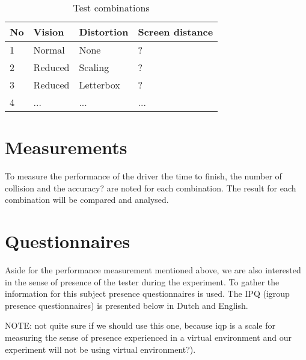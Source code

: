 \begin{table}[h]
\begin{tabular}{|l|lll|}
\hline
No & Vision  & Distortion & Screen distance \\\hline
1  & Normal  & None              & ?               \\
2  & Reduced & Scaling           & ?               \\
3  & Reduced & Letterbox           & ?               \\
4  & ...     & ...               & ...             \\\hline
\end{tabular}
\caption{Test combinations}
\label{measurementcombinations}
\end{table}


\section{Measurements}
To measure the performance of the driver the time to finish, the number of collision and the accuracy? are noted for each combination. The result for each combination will be compared and analysed.
\iffalse
- time
- accuracy
- collision
- driver comfort level (This can be achieved by using questionnaires)
- Screen distance
- Screen resolution
- Screen Size
Reduced vs no-reduced.
\fi

\section{Questionnaires}
Aside for the performance measurement mentioned above, we are also interested in the sense of presence of the tester during the experiment. To gather the information for this subject presence questionnaires is used. The IPQ (igroup presence questionnaires) is presented below in Dutch and English. 

NOTE: not quite sure if we should use this one, because iqp is a scale for measuring the sense of presence experienced in a virtual environment and our experiment will not be using virtual environment?).

